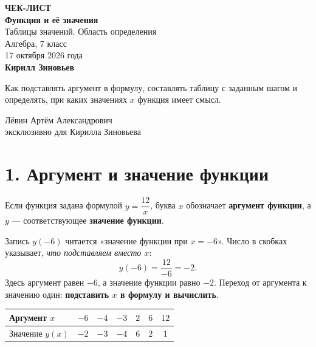 \documentclass[a4paper,12pt]{article}
\newcommand{\key}[1]{\textbf{\color{darkaccent}#1}}
\newcommand{\sectionrule}{\vspace{-0.55em}{\color{accent}\hrule height .6pt}\vspace{0.5em}}
\begin{document}
\thispagestyle{empty}
\begin{center}
\vspace*{24mm}
{\Large\color{darkaccent}\bfseries ЧЕК-ЛИСТ}\\[12mm]
{\huge\bfseries Функция и её значения}\\[5mm]
{\Large Таблицы значений. Область определения}\\[13mm]
{\large Алгебра, 7 класс}\\[3mm]
{\large 17 октября 2026 года}\\[21mm]
{\LARGE\bfseries Кирилл Зиновьев}\\[14mm]
\begin{minipage}{.78\linewidth}\centering
Как подставлять аргумент в формулу, составлять таблицу с заданным шагом и определять, при каких значениях $x$ функция имеет смысл.
\end{minipage}
\vfill
{\large Лёвин Артём Александрович}\\[2mm]
{\normalsize эксклюзивно для Кирилла Зиновьева}\\[13mm]
\end{center}
\clearpage

\section*{1. Аргумент и значение функции}
\sectionrule
Если функция задана формулой $y=\dfrac{12}{x}$, буква \key{$x$} обозначает \key{аргумент функции}, а $y$ --- соответствующее \key{значение функции}.

Запись $y(-6)$ читается «значение функции при $x=-6$». Число в скобках указывает, \emph{что подставляем вместо $x$}:
\[
\boxed{y(-6)=\frac{12}{-6}=-2.}
\]
Здесь аргумент равен $-6$, а значение функции равно $-2$. Переход от аргумента к значению один: \key{подставить $x$ в формулу и вычислить}.

\begin{center}
\renewcommand{\arraystretch}{1.35}
\begin{tabularx}{\linewidth}{@{}l*{6}{C}@{}}
\toprule
Аргумент $x$ & $-6$ & $-4$ & $-3$ & $2$ & $6$ & $12$\\
\midrule
Значение $y(x)$ & $-2$ & $-3$ & $-4$ & $6$ & $2$ & $1$\\
\bottomrule
\end{tabularx}
\end{center}
\end{document}
